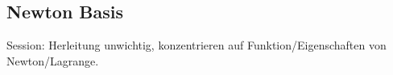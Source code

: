 \subsection{Newton Basis}
Session: Herleitung unwichtig, konzentrieren auf Funktion/Eigenschaften von Newton/Lagrange.
